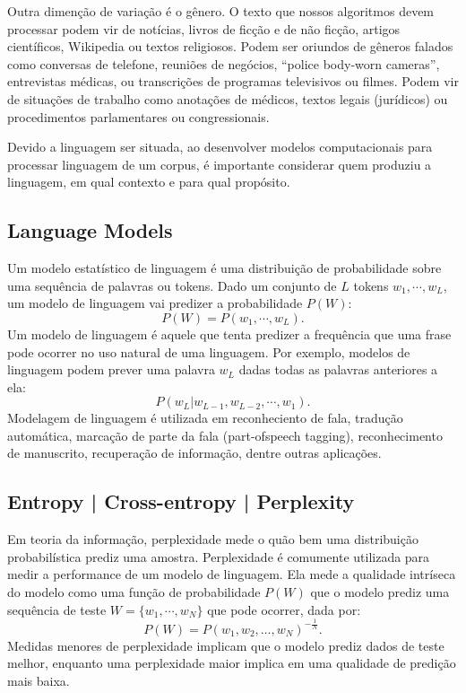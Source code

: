 \documentclass{automatextcc}
\begin{document}
Outra dimenção de variação é o gênero. O texto que nossos algoritmos devem processar podem vir de notícias, livros de ficção e de não ficção, artigos científicos, Wikipedia ou textos religiosos. Podem ser oriundos de gêneros falados como conversas de telefone, reuniões de negócios, ``police body-worn cameras'', entrevistas médicas, ou transcrições de programas televisivos ou filmes. Podem vir de situações de trabalho como anotações de médicos, textos legais (jurídicos) ou procedimentos parlamentares ou congressionais.

Devido a linguagem ser situada, ao desenvolver modelos computacionais para processar linguagem de um corpus, é importante considerar quem produziu a linguagem, em qual contexto e para qual propósito.


\subsection{Language Models}
Um modelo estatístico de linguagem é uma distribuição de probabilidade sobre uma sequência de palavras ou tokens. Dado um conjunto de $L$ tokens $w_1,\cdots,w_L$, um modelo de linguagem vai predizer a probabilidade $P(W)$:
\begin{equation}
    P(W) = P(w_1,\cdots,w_L).
\end{equation}
Um modelo de linguagem é aquele que tenta predizer a frequência que uma frase pode ocorrer no uso natural de uma linguagem. Por exemplo, modelos de linguagem podem prever uma palavra $w_L$ dadas todas as palavras anteriores a ela:
\begin{equation}
    P(w_L | w_{L-1},w_{L-2},\cdots,w_1).
\end{equation}
Modelagem de linguagem é utilizada em reconheciento de fala, tradução automática, marcação de parte da fala (part-ofspeech tagging), reconhecimento de manuscrito, recuperação de informação, dentre outras aplicações. 
\citep{kamath2019, jurafsky2021}

\subsection{Entropy | Cross-entropy | Perplexity}
Em teoria da informação, perplexidade mede o quão bem uma distribuição probabilística prediz uma amostra. Perplexidade é comumente utilizada para medir a performance de um modelo de linguagem. Ela mede a qualidade intríseca do modelo como uma função de probabilidade $P(W)$ que o modelo prediz uma sequência de teste $W = \{w_1,\cdots,w_N\}$ que pode ocorrer, dada por:
\begin{equation}
    P(W) = P(w_1, w_2, \dots, w_N)^{-\frac{1}{N}}.
\end{equation}
Medidas menores de perplexidade implicam que o modelo prediz dados de teste melhor, enquanto uma perplexidade maior implica em uma qualidade de predição mais baixa.
\citep{kamath2019}
\end{document}
